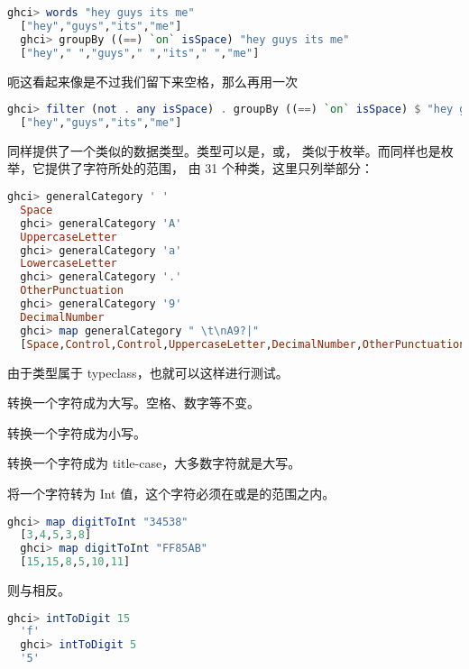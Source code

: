 \documentclass[./main.tex]{subfiles}
\begin{document}
\begin{lstlisting}[language=Haskell]
  ghci> words "hey guys its me"
  ["hey","guys","its","me"]
  ghci> groupBy ((==) `on` isSpace) "hey guys its me"
  ["hey"," ","guys"," ","its"," ","me"]
\end{lstlisting}

呃这看起来像是不过我们留下来空格，那么再用一次

\begin{lstlisting}[language=Haskell]
  ghci> filter (not . any isSpace) . groupBy ((==) `on` isSpace) $ "hey guys its me"
  ["hey","guys","its","me"]
\end{lstlisting}

同样提供了一个类似的数据类型。类型可以是，或，
类似于枚举。而同样也是枚举，它提供了字符所处的范围，
由 31 个种类，这里只列举部分：

\begin{lstlisting}[language=Haskell]
  ghci> generalCategory ' '
  Space
  ghci> generalCategory 'A'
  UppercaseLetter
  ghci> generalCategory 'a'
  LowercaseLetter
  ghci> generalCategory '.'
  OtherPunctuation
  ghci> generalCategory '9'
  DecimalNumber
  ghci> map generalCategory " \t\nA9?|"
  [Space,Control,Control,UppercaseLetter,DecimalNumber,OtherPunctuation,MathSymbol]
\end{lstlisting}

由于类型属于 typeclass，也就可以这样进行测试。

转换一个字符成为大写。空格、数字等不变。

转换一个字符成为小写。

转换一个字符成为 title-case，大多数字符就是大写。

将一个字符转为 Int 值，这个字符必须在或是的范围之内。

\begin{lstlisting}[language=Haskell]
  ghci> map digitToInt "34538"
  [3,4,5,3,8]
  ghci> map digitToInt "FF85AB"
  [15,15,8,5,10,11]
\end{lstlisting}

则与相反。

\begin{lstlisting}[language=Haskell]
  ghci> intToDigit 15
  'f'
  ghci> intToDigit 5
  '5'
\end{lstlisting}
\end{document}
